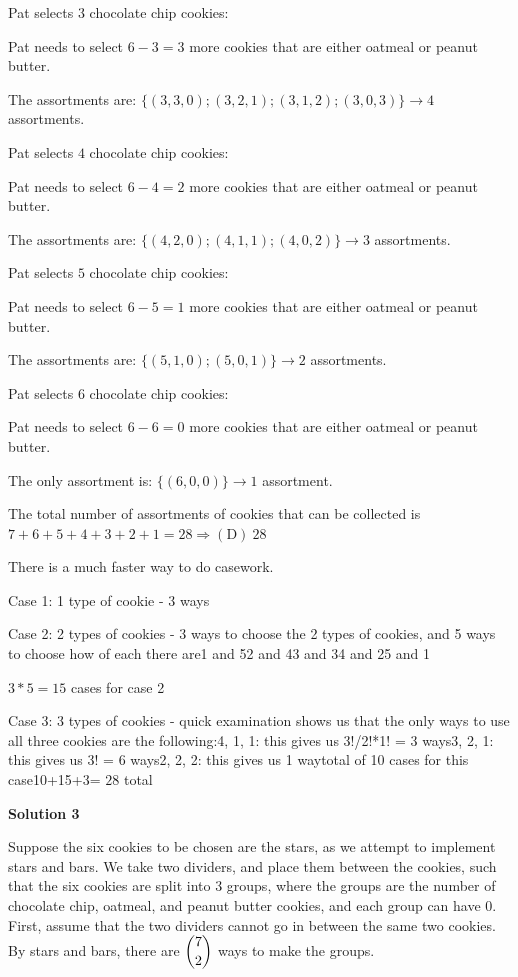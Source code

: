 \begin{enumerate}
 Pat selects $3$ chocolate chip cookies: 

 Pat needs to select $6-3=3$ more cookies that are either oatmeal or peanut butter. 

 The assortments are: $\{(3,3,0); (3,2,1); (3,1,2); (3,0,3)\} \rightarrow 4$ assortments. 

 Pat selects $4$ chocolate chip cookies: 

 Pat needs to select $6-4=2$ more cookies that are either oatmeal or peanut butter. 

 The assortments are: $\{(4,2,0); (4,1,1); (4,0,2)\} \rightarrow 3$ assortments. 

 Pat selects $5$ chocolate chip cookies: 

 Pat needs to select $6-5=1$ more cookies that are either oatmeal or peanut butter. 

 The assortments are: $\{(5,1,0); (5,0,1)\} \rightarrow 2$ assortments. 

 Pat selects $6$ chocolate chip cookies: 

 Pat needs to select $6-6=0$ more cookies that are either oatmeal or peanut butter. 

 The only assortment is: $\{(6,0,0)\} \rightarrow 1$ assortment. 

 The total number of assortments of cookies that can be collected is $7+6+5+4+3+2+1=28 \Rightarrow\boxed{\mathrm{(D)}\ 28}$

 There is a much faster way to do casework.

 Case 1: 1 type of cookie - 3 ways

 Case 2: 2 types of cookies - 3 ways to choose the 2 types of cookies, and 5 ways to choose how of each there are1 and 52 and 43 and 34 and 25 and 1

 $3*5=15$ cases for case 2

 Case 3: 3 types of cookies - quick examination shows us that the only ways to use all three cookies are the following:4, 1, 1: this gives us 3!/2!*1! = 3 ways3, 2, 1: this gives us 3! = 6 ways2, 2, 2: this gives us 1 waytotal of 10 cases for this case10+15+3= $28$ total

 


 



\textbf{Solution 3}

Suppose the six cookies to be chosen are the stars, as we attempt to implement stars and bars. We take two dividers, and place them between the cookies, such that the six cookies are split into 3 groups, where the groups are the number of chocolate chip, oatmeal, and peanut butter cookies, and each group can have 0. First, assume that the two dividers cannot go in between the same two cookies. By stars and bars, there are $\dbinom{7}{2}$ ways to make the groups.


\end{enumerate}
